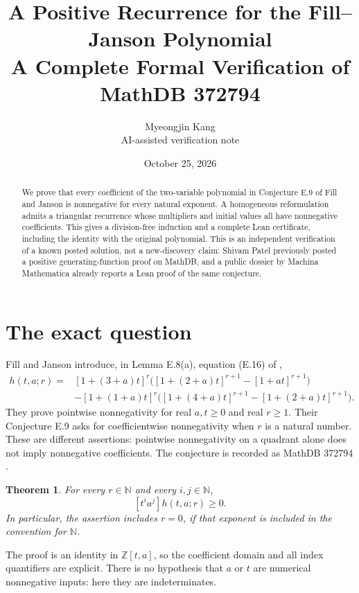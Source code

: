 \documentclass[11pt]{article}
\title{A Positive Recurrence for the Fill--Janson Polynomial\\A Complete Formal Verification of MathDB 372794}
\author{Myeongjin Kang\\\small AI-assisted verification note}
\date{October 25, 2026}
\newtheorem{theorem}{Theorem}
\newcommand{\NN}{\mathbb N}
\newcommand{\ZZ}{\mathbb Z}
\begin{document}
\maketitle
\begin{abstract}
We prove that every coefficient of the two-variable polynomial in Conjecture E.9 of Fill and Janson is nonnegative for every natural exponent. A homogeneous reformulation admits a triangular recurrence whose multipliers and initial values all have nonnegative coefficients. This gives a division-free induction and a complete Lean certificate, including the identity with the original polynomial. This is an independent verification of a known posted solution, not a new-discovery claim: Shivam Patel previously posted a positive generating-function proof on MathDB, and a public dossier by Machina Mathematica already reports a Lean proof of the same conjecture.
\end{abstract}

\section{The exact question}
Fill and Janson introduce, in Lemma E.8(a), equation (E.16) of \cite{FJ},
\begin{align*}
h(t,a;r)={}&[1+(3+a)t]^r\bigl([1+(2+a)t]^{r+1}-[1+at]^{r+1}\bigr)\\
&-[1+(1+a)t]^r\bigl([1+(4+a)t]^{r+1}-[1+(2+a)t]^{r+1}\bigr).
\end{align*}
They prove pointwise nonnegativity for real $a,t\geq0$ and real $r\geq1$. Their Conjecture E.9 asks for coefficientwise nonnegativity when $r$ is a natural number. These are different assertions: pointwise nonnegativity on a quadrant alone does not imply nonnegative coefficients. The conjecture is recorded as MathDB 372794 \cite{DB}.

\begin{theorem}\label{thm:main}
For every $r\in\NN$ and every $i,j\in\NN$,
\[
[t^i a^j]h(t,a;r)\geq0.
\]
In particular, the assertion includes $r=0$, if that exponent is included in the convention for $\NN$.
\end{theorem}
The proof is an identity in $\ZZ[t,a]$, so the coefficient domain and all index quantifiers are explicit. There is no hypothesis that $a$ or $t$ are numerical nonnegative inputs: here they are indeterminates.
\end{document}
